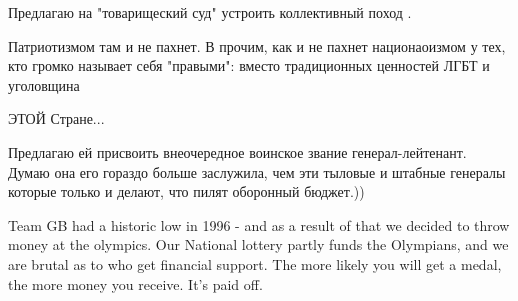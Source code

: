 \begin{itemize}
Предлагаю на "товарищеский суд" устроить коллективный поход .

 

Патриотизмом там и не пахнет. В прочим, как и не пахнет национаоизмом у тех,
кто громко называет себя "правыми": вместо традиционных ценностей ЛГБТ и
уголовщина


 
ЭТОЙ Стране...

 

Предлагаю ей присвоить внеочередное воинское звание генерал-лейтенант. Думаю
она его гораздо больше заслужила, чем эти тыловые и штабные генералы которые
только и делают, что пилят оборонный бюджет.))


 

Team GB had a historic low in 1996 - and as a result of that we decided to
throw money at the olympics. Our National lottery partly funds the Olympians,
and we are brutal as to who get financial support. The more likely you will get
a medal, the more money you receive. It’s paid off.
\end{itemize}

